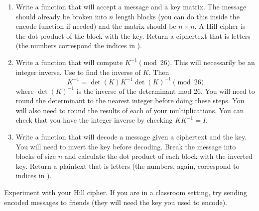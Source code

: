 \begin{problem}
\begin{enumerate}
\item Write a function that will accept a message and a key matrix.  
The message should already be broken into $n$ length blocks (you can do this inside the encode function if needed) and the matrix should be $n \times n$.
A Hill cipher is the dot product of the block with the key.  Return a ciphertext that is letters (the numbers correspond the indices in ).

\item Write a function that will compute $K^{-1} \pmod{26}$.  This will necessarily be an integer inverse.
Use  to find the inverse of $K$. 
Then \[K^{-1} = \det(K)K^{-1}\det(K)^{-1}  \pmod{26}\] where $\det(K)^{-1}$ is the inverse of the determinant mod 26.
You will need to round the determinant to the nearest integer before doing these steps.  You will also need to round the results of each of your multiplications.
You can check that you have the integer inverse by checking $KK^{-1} = I$.

\item Write a function that will decode a message given a ciphertext and the key.
You will need to invert the key before decoding.  Break the message into blocks of size $n$ and calculate the dot product of each block with the inverted key.
Return a plaintext that is letters (the numbers, again, correspond to indices in ).
\end{enumerate}

Experiment with your Hill cipher.  If you are in a classroom setting, try sending encoded messages to friends (they will need the key you used to encode).
\end{problem}


